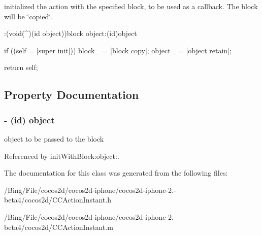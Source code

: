 initialized the action with the specified block, to be used as a callback. The block will be \char`\"{}copied\char`\"{}. 
\begin{DoxyCode}
                   :(void(^)(id object))block object:(id)object
{
        if ((self = [super init])) {
                block_ = [block copy];
                object_ = [object retain];
        }

        return self;
}
\end{DoxyCode}


\subsection{Property Documentation}
\hypertarget{interface_c_c_call_block_o_a4c593d3153aec9610ec97d388371ce07}{
\subsubsection[{object}]{\setlength{\rightskip}{0pt plus 5cm}-\/ (id) {\bf object}}}\label{interface_c_c_call_block_o_a4c593d3153aec9610ec97d388371ce07}
object to be passed to the block 

Referenced by init\-With\-Block\-:object\-:.



The documentation for this class was generated from the following files\-:\begin{DoxyCompactItemize}
\item 
/\-Bing/\-File/cocos2d/cocos2d-\/iphone/cocos2d-\/iphone-\/2.-\/beta4/cocos2d/C\-C\-Action\-Instant.\-h\item 
/\-Bing/\-File/cocos2d/cocos2d-\/iphone/cocos2d-\/iphone-\/2.-\/beta4/cocos2d/C\-C\-Action\-Instant.\-m\end{DoxyCompactItemize}
